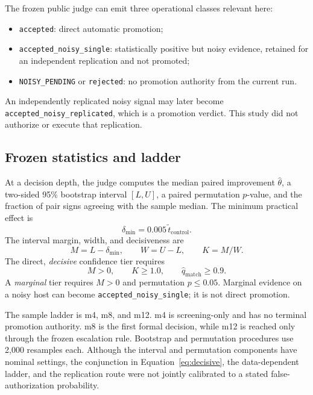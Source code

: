 \documentclass[10pt]{article}
\begin{document}
The frozen public judge can emit three operational classes relevant here:
\begin{itemize}
  \item \texttt{accepted}: direct automatic promotion;
  \item \texttt{accepted\_noisy\_single}: statistically positive but noisy
  evidence, retained for an independent replication and not promoted;
  \item \texttt{NOISY\_PENDING} or \texttt{rejected}: no promotion authority
  from the current run.
\end{itemize}
An independently replicated noisy signal may later become
\texttt{accepted\_noisy\_replicated}, which is a promotion verdict.  This study
did not authorize or execute that replication.

\subsection{Frozen statistics and ladder}

At a decision depth, the judge computes the median paired improvement
$\widehat\theta$, a two-sided 95\% bootstrap interval $[L,U]$, a paired
permutation $p$-value, and the fraction of pair signs agreeing with the sample
median.  The minimum practical effect is
\begin{equation}
  \delta_{\min}=0.005\,\widetilde t_{\mathrm{control}}.
\end{equation}
The interval margin, width, and decisiveness are
\begin{equation}
  M=L-\delta_{\min},\qquad W=U-L,\qquad K=M/W.
\end{equation}
The direct, \emph{decisive} confidence tier requires
\begin{equation}
  M>0,\qquad K\ge 1.0,\qquad
  \widehat q_{\mathrm{match}}\ge 0.9.
  \label{eq:decisive}
\end{equation}
A \emph{marginal} tier requires $M>0$ and permutation $p\le0.05$.
Marginal evidence on a noisy host can become
\texttt{accepted\_noisy\_single}; it is not direct promotion.

The sample ladder is m4, m8, and m12.  m4 is screening-only and has no terminal
promotion authority.  m8 is the first formal decision, while m12 is reached
only through the frozen escalation rule.  Bootstrap and permutation procedures
use 2,000 resamples each.  Although the interval and permutation components
have nominal settings, the conjunction in Equation~\ref{eq:decisive}, the
data-dependent ladder, and the replication route were not jointly calibrated
to a stated false-authorization probability.
\end{document}
